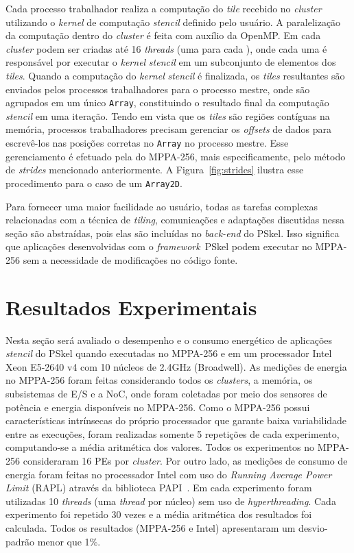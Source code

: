 \documentclass[12pt]{article}
\newcommand{\fw}{\textit{framework}\xspace}
\newcommand{\pskel}{PSkel\xspace}
\newcommand{\mppa}{MPPA-256\xspace}
\newcommand{\stencil}{\textit{stencil}\xspace}
\begin{document}
Cada processo trabalhador realiza a computação do \textit{tile} recebido no
\textit{cluster} utilizando o \textit{kernel} de computação \stencil definido
pelo usuário. A paralelização da computação dentro do \textit{cluster} é feita
com auxílio da \api OpenMP. Em cada \textit{cluster} podem ser criadas até 16
\textit{threads} (uma para cada \pe), onde cada uma é responsável por executar o
\textit{kernel} \stencil em um subconjunto de elementos dos \textit{tiles}.
Quando a computação do \textit{kernel} \stencil é finalizada, os \textit{tiles}
resultantes são enviados pelos processos trabalhadores para o processo mestre, onde
são agrupados em um único \texttt{Array}, constituindo o resultado final da
computação \stencil em uma iteração. Tendo em vista que os \textit{tiles} são
regiões contíguas na memória, processos trabalhadores precisam gerenciar os
\textit{offsets} de dados para escrevê-los nas posições corretas no
\texttt{Array} no processo mestre. Esse gerenciamento é efetuado pela \api do
\mppa, mais especificamente, pelo método de \textit{strides} mencionado
anteriormente. A Figura~\ref{fig:strides} ilustra esse procedimento para o caso
de um \texttt{Array2D}.

Para fornecer uma maior facilidade ao usuário, todas as tarefas complexas
relacionadas com a técnica de \textit{tiling}, comunicações \noc e adaptações
discutidas nessa seção são abstraídas, pois elas são incluídas no
\textit{back-end} do \pskel. Isso significa que aplicações desenvolvidas com o
\fw ~\pskel podem executar no \mppa sem a necessidade de modificações no código
fonte.

\section{Resultados Experimentais}
\label{sec:resultados}

Nesta seção será avaliado o desempenho e o consumo energético de aplicações
\stencil do \pskel quando executadas no \mppa e em um processador Intel Xeon
E5-2640 v4 com 10 núcleos de 2.4GHz (Broadwell). As medições de energia no \mppa
foram feitas considerando todos os \textit{clusters}, a memória, os subsistemas
de E/S e a NoC, onde foram coletadas por meio dos sensores de potência e energia
disponíveis no \mppa. Como o \mppa possui características intrínsecas do próprio
processador que garante baixa variabilidade entre as execuções, foram realizadas
somente 5 repetições de cada experimento, computando-se a média aritmética dos
valores. Todos os experimentos no \mppa consideraram 16 PEs por
\textit{cluster}. Por outro lado, as medições de consumo de energia foram feitas
no processador Intel com uso do \textit{Running Average Power Limit} (RAPL)
através da biblioteca PAPI~\cite{papi12}. Em cada experimento foram utilizadas
10 \textit{threads} (uma \textit{thread} por núcleo) sem uso de
\textit{hyperthreading}. Cada experimento foi repetido 30 vezes e a média
aritmética dos resultados foi calculada. Todos os resultados (\mppa e Intel)
apresentaram um desvio-padrão menor que 1$\%$.
\end{document}
